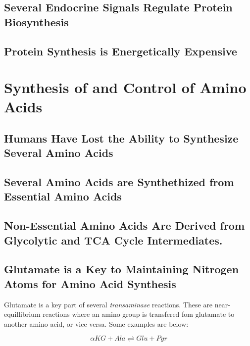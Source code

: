 \documentclass{tufte-handout}
\begin{document}
\subsection{Several Endocrine Signals Regulate Protein Biosynthesis}


\subsection{Protein Synthesis is Energetically Expensive}

\section{Synthesis of and Control of Amino Acids}

\subsection{Humans Have Lost the Ability to Synthesize Several Amino Acids}


\subsection{Several Amino Acids are Synthethized from Essential Amino Acids}

\subsection{Non-Essential Amino Acids Are Derived from Glycolytic and TCA Cycle Intermediates.}

\subsection{Glutamate is a Key to Maintaining Nitrogen Atoms for Amino Acid Synthesis}

Glutamate is a key part of several \emph{transaminase} reactions.  These are near-equillibrium reactions where an amino group is transfered fom glutamate to another amino acid, or vice versa.  Some examples are below:

 \begin{equation}\label{eq:alt}
\alpha KG + Ala \rightleftharpoons Glu + Pyr
\end{equation}
\end{document}
